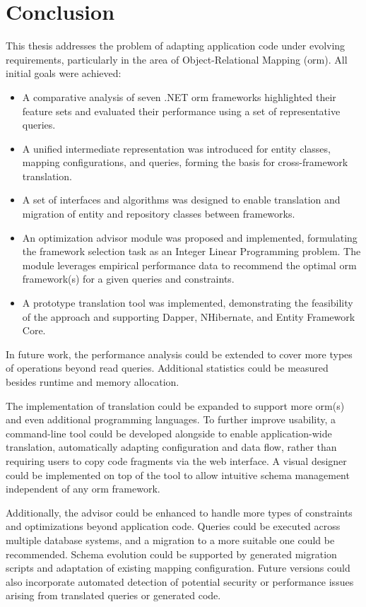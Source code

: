 \chapter*{Conclusion}

This thesis addresses the problem of adapting application code under evolving requirements, particularly in the area of Object-Relational Mapping (\acrshort{orm}). All initial goals were achieved:

\begin{itemize}
    \item A comparative analysis of seven .NET \acrshort{orm} frameworks highlighted their feature sets and evaluated their performance using a set of representative queries.
    \item A unified intermediate representation was introduced for entity classes, mapping configurations, and queries, forming the basis for cross-framework translation.
    \item A set of interfaces and algorithms was designed to enable translation and migration of entity and repository classes between frameworks.
    \item An optimization advisor module was proposed and implemented, formulating the framework selection task as an Integer Linear Programming problem. The module leverages empirical performance data to recommend the optimal \acrshort{orm} framework(s) for a given queries and constraints.
    \item A prototype translation tool was implemented, demonstrating the feasibility of the approach and supporting Dapper, NHibernate, and Entity Framework Core.
\end{itemize}

In future work, the performance analysis could be extended to cover more types of operations beyond read queries. Additional statistics could be measured besides runtime and memory allocation. 

The implementation of translation could be expanded to support more \acrshort{orm}(s) and even additional programming languages. To further improve usability, a command-line tool could be developed alongside to enable application-wide translation, automatically adapting configuration and data flow, rather than requiring users to copy code fragments via the web interface. A visual designer could be implemented on top of the tool to allow intuitive schema management independent of any \acrshort{orm} framework.

Additionally, the advisor could be enhanced to handle more types of constraints and optimizations beyond application code. Queries could be executed across multiple database systems, and a migration to a more suitable one could be recommended. Schema evolution could be supported by generated migration scripts and adaptation of existing mapping configuration. Future versions could also incorporate automated detection of potential security or performance issues arising from translated queries or generated code.
